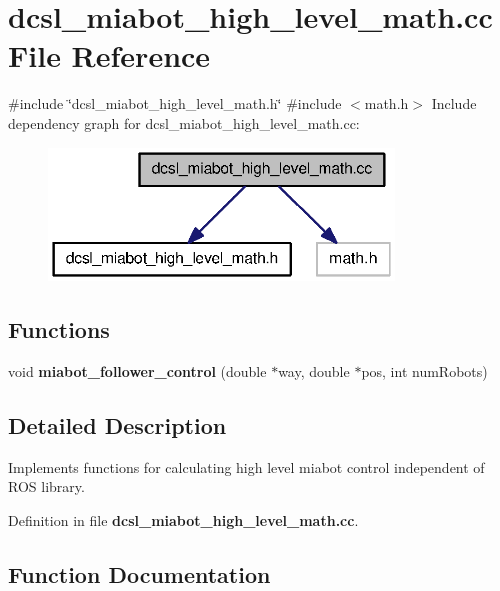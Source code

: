 \section{dcsl\-\_\-miabot\-\_\-high\-\_\-level\-\_\-math.\-cc \-File \-Reference}
\label{dcsl__miabot__high__level__math_8cc}
{\ttfamily \#include \char`\"{}dcsl\-\_\-miabot\-\_\-high\-\_\-level\-\_\-math.\-h\char`\"{}}\*
{\ttfamily \#include $<$math.\-h$>$}\*
\-Include dependency graph for dcsl\-\_\-miabot\-\_\-high\-\_\-level\-\_\-math.\-cc\-:
\nopagebreak
\begin{figure}[H]
\begin{center}
\leavevmode
\includegraphics[width=260pt]{dcsl__miabot__high__level__math_8cc__incl}
\end{center}
\end{figure}
\subsection*{\-Functions}
\begin{DoxyCompactItemize}
\item 
void {\bf miabot\-\_\-follower\-\_\-control} (double $\ast$way, double $\ast$pos, int num\-Robots)
\end{DoxyCompactItemize}


\subsection{\-Detailed \-Description}
\-Implements functions for calculating high level miabot control independent of \-R\-O\-S library. 

\-Definition in file {\bf dcsl\-\_\-miabot\-\_\-high\-\_\-level\-\_\-math.\-cc}.



\subsection{\-Function \-Documentation}
